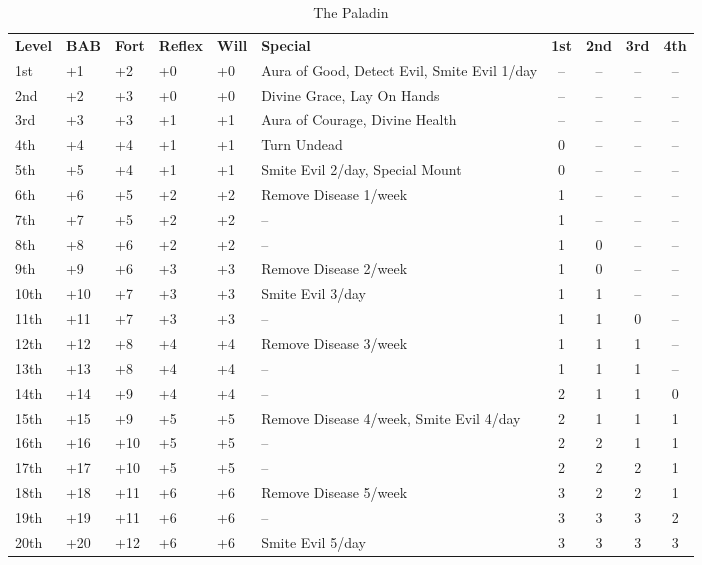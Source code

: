 \begin{table}[htb]
\caption{The Paladin}
\centering
\begin{tabular}{*{6}{l}*{4}{c}}
\textbf{Level} & \textbf{BAB} & \textbf{Fort} & \textbf{Reflex} & \textbf{Will} & \textbf{Special} & \textbf{1st} & \textbf{2nd} & \textbf{3rd} & \textbf{4th} \\
1st & +1 & +2 & +0 & +0 & Aura of Good, Detect Evil, Smite Evil 1/day & -- & -- & -- & -- \\
2nd & +2 & +3 & +0 & +0 & Divine Grace, Lay On Hands & -- & -- & -- & -- \\
3rd & +3 & +3 & +1 & +1 & Aura of Courage, Divine Health & -- & -- & -- & -- \\
4th & +4 & +4 & +1 & +1 & Turn Undead & 0 & -- & -- & -- \\
5th & +5 & +4 & +1 & +1 & Smite Evil 2/day, Special Mount & 0 & -- & -- & -- \\
6th & +6 & +5 & +2 & +2 & Remove Disease 1/week & 1 & -- & -- & -- \\
7th & +7 & +5 & +2 & +2 & -- & 1 & -- & -- & -- \\
8th & +8 & +6 & +2 & +2 & -- & 1 & 0 & -- & -- \\
9th & +9 & +6 & +3 & +3 & Remove Disease 2/week & 1 & 0 & -- & -- \\
10th & +10 & +7 & +3 & +3 & Smite Evil 3/day & 1 & 1 & -- & -- \\
11th & +11 & +7 & +3 & +3 & -- & 1 & 1 & 0 & -- \\
12th & +12 & +8 & +4 & +4 & Remove Disease 3/week & 1 & 1 & 1 & -- \\
13th & +13 & +8 & +4 & +4 & -- & 1 & 1 & 1 & -- \\
14th & +14 & +9 & +4 & +4 & -- & 2 & 1 & 1 & 0 \\
15th & +15 & +9 & +5 & +5 & Remove Disease 4/week, Smite Evil 4/day & 2 & 1 & 1 & 1 \\
16th & +16 & +10 & +5 & +5 & -- & 2 & 2 & 1 & 1 \\
17th & +17 & +10 & +5 & +5 & -- & 2 & 2 & 2 & 1 \\
18th & +18 & +11 & +6 & +6 & Remove Disease 5/week & 3 & 2 & 2 & 1 \\
19th & +19 & +11 & +6 & +6 & -- & 3 & 3 & 3 & 2 \\
20th & +20 & +12 & +6 & +6 & Smite Evil 5/day & 3 & 3 & 3 & 3 \\
\end{tabular}
\end{table}

